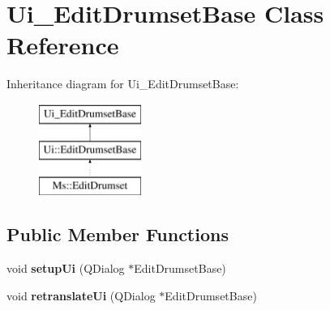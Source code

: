 \hypertarget{class_ui___edit_drumset_base}{}\section{Ui\+\_\+\+Edit\+Drumset\+Base Class Reference}
\label{class_ui___edit_drumset_base}
Inheritance diagram for Ui\+\_\+\+Edit\+Drumset\+Base\+:\begin{figure}[H]
\begin{center}
\leavevmode
\includegraphics[height=3.000000cm]{class_ui___edit_drumset_base}
\end{center}
\end{figure}
\subsection*{Public Member Functions}
\begin{DoxyCompactItemize}
\item 
\mbox{\label{class_ui___edit_drumset_base_a70294703ea05214baf47fb941162525b}} 
void {\bfseries setup\+Ui} (Q\+Dialog $\ast$Edit\+Drumset\+Base)
\item 
\mbox{\label{class_ui___edit_drumset_base_ad68b5c4c68e3c8e52130bf3b147dca09}} 
void {\bfseries retranslate\+Ui} (Q\+Dialog $\ast$Edit\+Drumset\+Base)
\end{DoxyCompactItemize}
